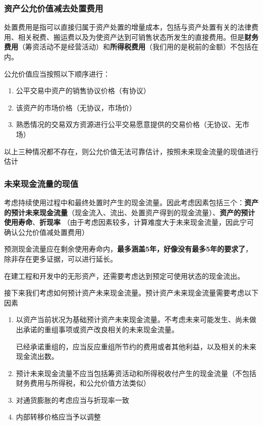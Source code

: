 \documentclass[UTF8,12pt]{ctexart}
\numberwithin{equation}{section} %
\numberwithin{figure}{section}
\numberwithin{table}{section}
\begin{document}
	\subsubsection{资产公允价值减去处置费用}
	处置费用是指可以直接归属于资产处置的增量成本，包括与资产处置有关的法律费用、相关税费、搬运费以及为使资产达到可销售状态所发生的直接费用。但是\textbf{财务费用}（筹资活动不是经营活动）和\textbf{所得税费用}（我们用的是税前的金额）不包括在内。
	
	公允价值应当按照以下顺序进行：
	\begin{enumerate}
		\item 公平交易中资产的销售协议价格（有协议）
		
		\item 该资产的市场价格（无协议，市场价）
		
		\item 熟悉情况的交易双方资源进行公平交易愿意提供的交易价格（无协议、无市场）
	\end{enumerate}
	以上三种情况都不存在，则公允价值无法可靠估计，按照未来现金流量的现值进行估计
	
	\subsubsection{未来现金流量的现值}
	考虑持续使用过程中和最终处置时产生的现金流量。因此考虑因素包括三个：\textbf{资产的预计未来现金流量}（现金流入、流出、处置资产得到的现金流量）、\textbf{资产的预计使用寿命}、\textbf{折现率} （由于考虑因素较多，计算难度大于未来现金流量，因此宁可确认公允价值减处置费用）
	
	预测现金流量应在剩余使用寿命内，\textbf{最多涵盖5年，好像没有最多5年的要求了}，除非存在更多证据，可以进行延长。
	
	在建工程和开发中的无形资产，还需要考虑达到预定可使用状态的现金流出。
	
	接下来我们考虑如何预计资产未来现金流量。预计资产未来现金流量需要考虑以下因素
	\begin{enumerate}
		\item 以资产当前状况为基础预计资产未来现金流量。不考虑未来可能发生、尚未做出承诺的重组事项或资产改良相关的未来现金流量。
		
		已经承诺重组的，应当反应重组所节约的费用或者其他利益，以及相关的未来现金流出数。
		
		\item 预计未来现金流量不应当包括筹资活动和所得税收付产生的现金流量（不包括财务费用与所得税，和公允价值方法类似）
		
		\item 对通货膨胀的考虑应当与折现率一致
		
		\item 内部转移价格应当予以调整
	\end{enumerate}
	
\end{document}
